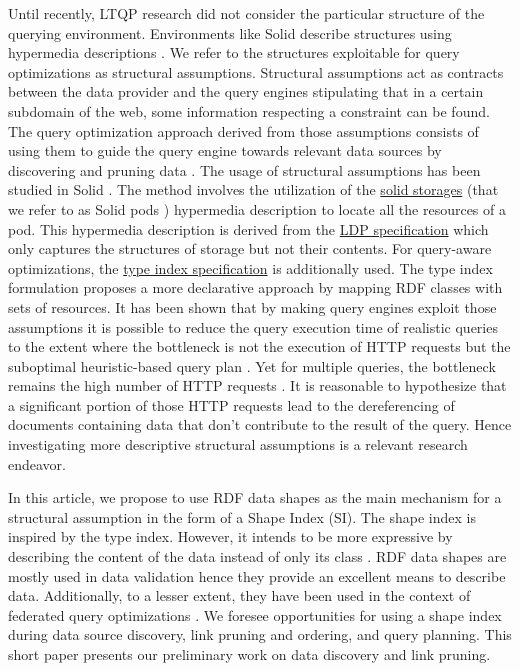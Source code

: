 Until recently, LTQP research did not consider the particular structure of the querying environment.
Environments like Solid describe structures using hypermedia descriptions \cite{Fielding}.
We refer to the structures exploitable for query optimizations as structural assumptions.
Structural assumptions act as contracts between the data provider and 
the query engines stipulating that in a certain subdomain of the web, some information respecting a constraint can be found.
The query optimization approach derived from those assumptions consists of using them to guide the query engine towards relevant data sources 
by discovering and pruning data \cite{verborgh2020guided}.
The usage of structural assumptions has been studied in Solid \cite{Taelman2023}.
The method involves the utilization of the 
\href{https://solidproject.org/TR/protocol#resources}{solid storages} (that we refer to as Solid pods \cite{Taelman2023}) hypermedia description
to locate all the resources of a pod. 
This hypermedia description is derived from the \href{https://www.w3.org/TR/ldp/}{LDP specification}
which only captures the structures of storage but not their contents.
For query-aware optimizations, the \href{https://solid.github.io/type-indexes/}{type index specification} is additionally used.
The type index formulation proposes a more declarative approach \cite{Taelman2017} by mapping RDF classes with sets of resources.
It has been shown that by making query engines exploit those assumptions it is possible to reduce the query execution time
of realistic queries to the extent where the bottleneck is not the execution of 
HTTP requests but the suboptimal heuristic-based query plan \cite{eschauzier_quweda_2023, Taelman2023}.
Yet for multiple queries, the bottleneck remains the high number of HTTP requests  \cite{eschauzier_quweda_2023}.
It is reasonable to hypothesize that a significant portion of those HTTP requests lead to the dereferencing of
documents containing data that don't contribute to the result of the query.
Hence investigating more descriptive structural assumptions is a relevant research endeavor.

In this article, we propose to use RDF data shapes as the main mechanism for a structural assumption in the form of a Shape Index (SI).
The shape index is inspired by the type index.
However, it intends to be more expressive by describing the content of the data instead of only its class \cite{Taelman2017}.
RDF data shapes are mostly used in data validation \cite{Gayo2018a} hence they provide an excellent means to describe data.
Additionally, to a lesser extent, they have been used in the context of federated query optimizations \cite{kashif2021}.
We foresee opportunities for using a shape index during data source discovery, link pruning and ordering, and query planning.
This short paper presents our preliminary work on data discovery and link pruning.